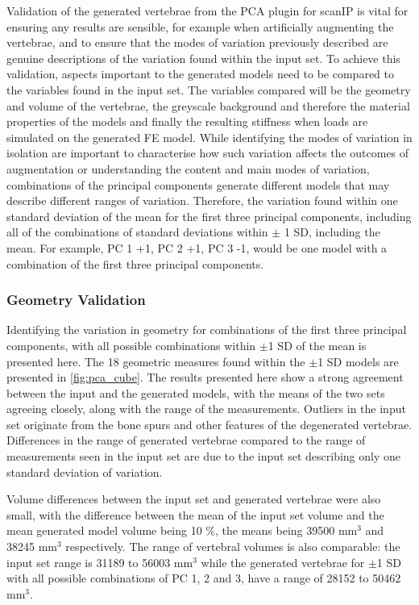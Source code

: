 Validation of the generated vertebrae from the PCA plugin for scanIP is vital
for ensuring any results are sensible, for example when artificially augmenting
the vertebrae, and to ensure that the modes of variation previously described
are genuine descriptions of the variation found within the input set.  To
achieve this validation, aspects important to the generated models need to be
compared to the variables found in the input set.  The variables compared will
be the geometry and volume of the vertebrae, the greyscale background and
therefore the material properties of the models and finally the resulting
stiffness when loads are simulated on the generated FE model.  While
identifying the modes of variation in isolation are important to characterise
how such variation affects the outcomes of augmentation or understanding the
content and main modes of variation, combinations of the principal components
generate different models that may describe different ranges of variation.
Therefore, the variation found within one standard deviation of the mean for
the first three principal components, including all of the combinations of
standard deviations within $\pm$ 1 SD, including the mean.  For example, PC 1
+1, PC 2 +1, PC 3 -1, would be one model with a combination of the first three
principal components.

\subsubsection{Geometry Validation}

Identifying the variation in geometry for combinations of the first three
principal components, with all possible combinations within $\pm$1 SD of the
mean is presented here.  The 18 geometric measures found within the $\pm$1 SD
models are presented in \cref{fig:pca_cube}.  The results presented here show a
strong agreement between the input and the generated models, with the means of
the two sets agreeing closely, along with the range of the measurements.
Outliers in the input set originate from the bone spurs and other features of
the degenerated vertebrae. %
Differences in the range
of generated vertebrae compared to the range of measurements seen in the input
set are due to the input set describing only one standard deviation of
variation.

Volume differences between the input set and generated vertebrae were also
small, with the difference between the mean of the input set volume and the
mean generated model volume being 10 \%, the means being 39500 mm$^3$ and 38245
mm$^3$ respectively.  The range of vertebral volumes is also comparable: the
input set range is 31189 to 56003 mm$^3$ while the generated vertebrae for
$\pm$1 SD with all possible combinations of PC 1, 2 and 3, have a range of
28152 to 50462 mm$^3$.

